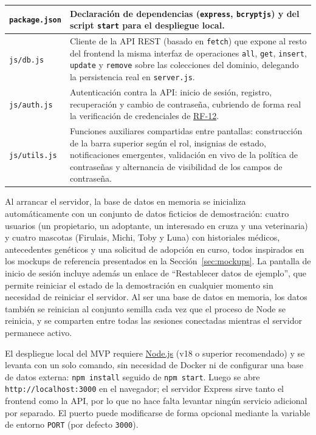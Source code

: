 \documentclass[journal,onecolumn]{IEEEtran}
\begin{document}
\begin{longtable}{@{}p{4.2cm} p{10.6cm}@{}}
		\hline
		\texttt{package.json} & Declaración de dependencias (\texttt{express}, \texttt{bcryptjs}) y del script \texttt{start} para el despliegue local. \\
		\hline
		\texttt{js/db.js} & Cliente de la API REST (basado en \texttt{fetch}) que expone al resto del frontend la misma interfaz de operaciones \texttt{all}, \texttt{get}, \texttt{insert}, \texttt{update} y \texttt{remove} sobre las colecciones del dominio, delegando la persistencia real en \texttt{server.js}. \\
		\hline
		\texttt{js/auth.js} & Autenticación contra la API: inicio de sesión, registro, recuperación y cambio de contraseña, cubriendo de forma real la verificación de credenciales de \hyperref[tab:RF-12]{RF-12}. \\
		\hline
		\texttt{js/utils.js} & Funciones auxiliares compartidas entre pantallas: construcción de la barra superior según el rol, insignias de estado, notificaciones emergentes, validación en vivo de la política de contraseñas y alternancia de visibilidad de los campos de contraseña. \\
	\end{longtable}
	
	Al arrancar el servidor, la base de datos en memoria se inicializa
	automáticamente con un conjunto de datos ficticios de demostración: cuatro
	usuarios (un propietario, un adoptante, un interesado en cruza y una
	veterinaria) y cuatro mascotas (Firulais, Michi, Toby y Luna) con
	historiales médicos, antecedentes genéticos y una solicitud de adopción en
	curso, todos inspirados en los mockups de referencia presentados en la
	Sección~\ref{sec:mockups}. La pantalla de inicio de sesión incluye
	además un enlace de \enquote{Restablecer datos de ejemplo}, que permite
	reiniciar el estado de la demostración en cualquier momento sin necesidad
	de reiniciar el servidor. Al ser una base de datos en memoria, los datos
	también se reinician al conjunto semilla cada vez que el proceso de Node
	se reinicia, y se comparten entre todas las sesiones conectadas mientras
	el servidor permanece activo.
	
	El despliegue local del MVP requiere \href{https://nodejs.org/}{Node.js}
	(v18 o superior recomendado) y se levanta con un solo comando, sin
	necesidad de Docker ni de configurar una base de datos externa:
	\texttt{npm install} seguido de \texttt{npm start}. Luego se abre
	\texttt{http://localhost:3000} en el navegador; el servidor Express sirve
	tanto el frontend como la API, por lo que no hace falta levantar ningún
	servicio adicional por separado. El puerto puede modificarse de forma
	opcional mediante la variable de entorno \texttt{PORT} (por defecto
	\texttt{3000}).
	
\end{document}

